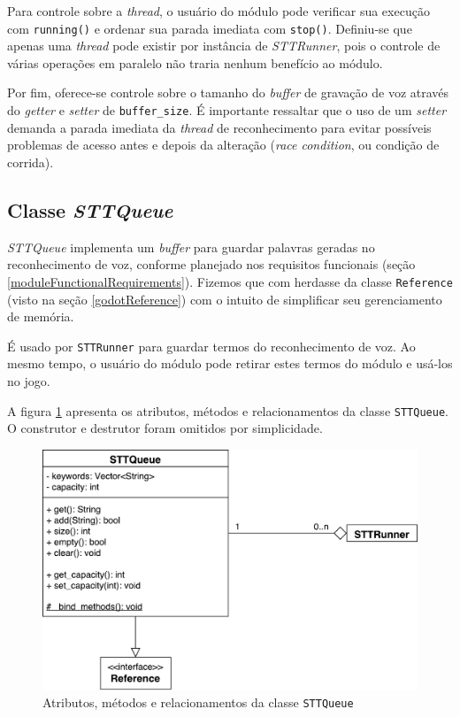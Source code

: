 Para controle sobre a \textit{thread}, o usuário do módulo pode verificar sua execução com \texttt{running()} e ordenar sua parada imediata com \texttt{stop()}. Definiu-se que apenas uma \textit{thread} pode existir por instância de \textit{STTRunner}, pois o controle de várias operações em paralelo não traria nenhum benefício ao módulo.

Por fim, oferece-se controle sobre o tamanho do \textit{buffer} de gravação de voz através do \textit{getter} e \textit{setter} de \texttt{buffer\_size}. É importante ressaltar que o uso de um \textit{setter} demanda a parada imediata da \textit{thread} de reconhecimento para evitar possíveis problemas de acesso antes e depois da alteração (\textit{race condition}, ou condição de corrida).


\subsection{Classe \textit{STTQueue}}
\label{stt-queue}

\textit{STTQueue} implementa um \textit{buffer} para guardar palavras geradas no reconhecimento de voz, conforme planejado nos requisitos funcionais (seção \ref{moduleFunctionalRequirements}). Fizemos que com herdasse da classe \texttt{Reference} (visto na seção \ref{godotReference}) com o intuito de simplificar seu gerenciamento de memória.

É usado por \texttt{STTRunner} para guardar termos do reconhecimento de voz. Ao mesmo tempo, o usuário do módulo pode retirar estes termos do módulo e usá-los no jogo.

A figura \ref{stt-queue-diagram} apresenta os atributos, métodos e relacionamentos da classe \texttt{STTQueue}. O construtor e destrutor foram omitidos por simplicidade.

\begin{figure}[H]
  \centering
  \includegraphics[width=.8\textwidth]{image/stt-queue.pdf}
  \caption{Atributos, métodos e relacionamentos da classe \texttt{STTQueue}}
  \label{stt-queue-diagram}
\end{figure}

